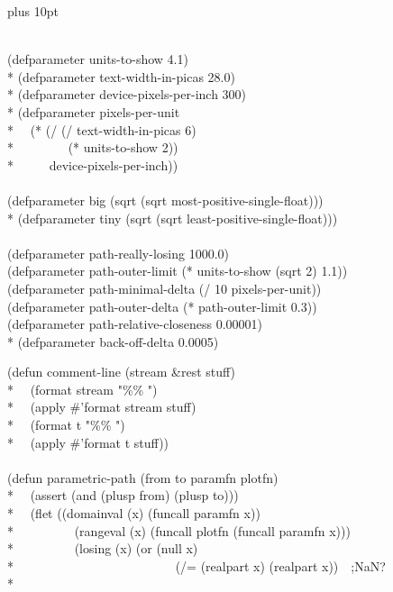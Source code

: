\begin{new}
\begingroup\small \topsep 0pt plus 10pt \relax
\begin{lisp}
\\
(defparameter units-to-show 4.1) \\*
(defparameter text-width-in-picas 28.0) \\*
(defparameter device-pixels-per-inch 300) \\*
(defparameter pixels-per-unit \\*
~~(* (/ (/ text-width-in-picas 6) \\*
~~~~~~~~(* units-to-show 2)) \\*
~~~~~device-pixels-per-inch)) \\
\\
(defparameter big (sqrt (sqrt most-positive-single-float))) \\*
(defparameter tiny (sqrt (sqrt least-positive-single-float))) \\
\\
(defparameter path-really-losing 1000.0) \\
(defparameter path-outer-limit (* units-to-show (sqrt 2) 1.1)) \\
(defparameter path-minimal-delta (/ 10 pixels-per-unit)) \\
(defparameter path-outer-delta (* path-outer-limit 0.3)) \\
(defparameter path-relative-closeness 0.00001) \\*
(defparameter back-off-delta 0.0005)
\end{lisp}
\newpage%
\begin{lisp}
(defun comment-line (stream \&rest stuff) \\*
~~(format stream "{\Xtilde}\%\% ") \\*
~~(apply \#'format stream stuff) \\*
~~(format t "{\Xtilde}\%\% ") \\*
~~(apply \#'format t stuff)) \\
\\
(defun parametric-path (from to paramfn plotfn) \\*
~~(assert (and (plusp from) (plusp to))) \\*
~~(flet ((domainval (x) (funcall paramfn x)) \\*
~~~~~~~~~(rangeval (x) (funcall plotfn (funcall paramfn x))) \\*
~~~~~~~~~(losing (x) (or (null x) \\*
~~~~~~~~~~~~~~~~~~~~~~~~~(/= (realpart x) (realpart x))~~;NaN? \\*

\end{lisp}
\end{new}
